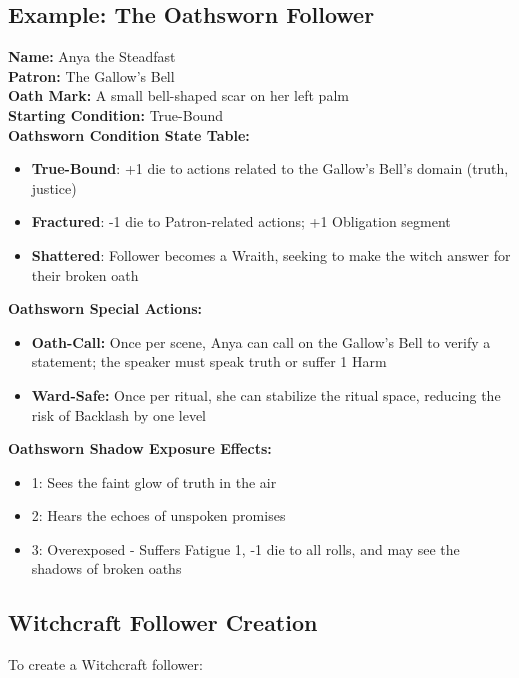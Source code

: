 \subsection{Example: The Oathsworn Follower}

\textbf{Name:} Anya the Steadfast \\
\textbf{Patron:} The Gallow's Bell \\
\textbf{Oath Mark:} A small bell-shaped scar on her left palm \\
\textbf{Starting Condition:} True-Bound \\

\textbf{Oathsworn Condition State Table:}
\begin{itemize}
    \item \textbf{True-Bound}: +1 die to actions related to the Gallow's Bell's domain (truth, justice)
    \item \textbf{Fractured}: -1 die to Patron-related actions; +1 Obligation segment
    \item \textbf{Shattered}: Follower becomes a Wraith, seeking to make the witch answer for their broken oath
\end{itemize}

\textbf{Oathsworn Special Actions:}
\begin{itemize}
    \item \textbf{Oath-Call:} Once per scene, Anya can call on the Gallow's Bell to verify a statement; the speaker must speak truth or suffer 1 Harm
    \item \textbf{Ward-Safe:} Once per ritual, she can stabilize the ritual space, reducing the risk of Backlash by one level
\end{itemize}

\textbf{Oathsworn Shadow Exposure Effects:}
\begin{itemize}
    \item 1: Sees the faint glow of truth in the air
    \item 2: Hears the echoes of unspoken promises
    \item 3: Overexposed - Suffers Fatigue 1, -1 die to all rolls, and may see the shadows of broken oaths
\end{itemize}

\subsection{Witchcraft Follower Creation}

To create a Witchcraft follower:

